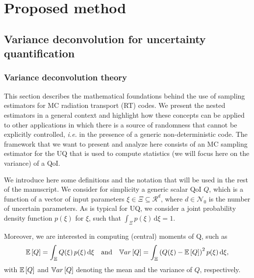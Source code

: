 \chapter{Proposed method} \label{ch-method}

\section{Variance deconvolution for uncertainty quantification}

\subsection{Variance deconvolution theory}

This section describes the mathematical foundations behind the use of sampling estimators for MC radiation transport (RT) codes. We present the nested estimators in a general context and highlight how these concepts can be applied to other applications in which there is a source of randomness that cannot be explicitly controlled, \textit{i.e.} in the presence of a generic non-deterministic code. The framework that we want to present and analyze here consists of an MC sampling estimator for the UQ that is used to compute statistics (we will focus here on the variance) of a QoI.

We introduce here some definitions and the notation that will be used in the rest of the manuscript. We consider for simplicity a generic scalar QoI $Q$, which is a function of a vector of input parameters $\xi \in \Xi \subseteq \mathcal{R}^d$, where $d \in \mathcal{N}_0$ is the number of uncertain parameters. As is typical for UQ, we consider a joint probability density function $p(\xi)$ for $\xi$, such that 
$\int_{\Xi} p(\xi) \, \mathrm{d}\xi = 1.$

Moreover, we are interested in computing (central) moments of Q, such as
\begin{equation}
\label{eq:UQmoments}
  \mathbb{E}\left[Q\right]  = \int_\Xi{ Q(\xi) \, p(\xi) \, \mathrm{d}\xi  } \quad \mathrm{and} \quad 
  \mathbb{V}ar\left[Q\right] = \int_\Xi{ \left( Q(\xi) - \mathbb{E}\left[Q\right] \right)^2 p(\xi) \, \mathrm{d}\xi  },
\end{equation}
with $\mathbb{E}\left[Q\right]$ and $\mathbb{V}ar\left[Q\right]$ denoting the mean and the variance of $Q$, respectively.


